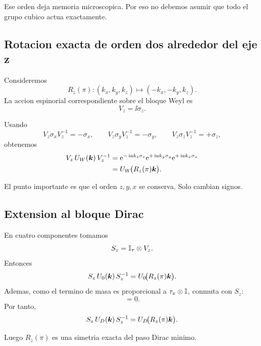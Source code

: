 Ese orden deja memoria microscopica. Por eso no debemos asumir que todo el grupo cubico actua exactamente.

\subsection{Rotacion exacta de orden dos alrededor del eje z}
Consideremos
\begin{equation}
R_z(\pi):(k_x,k_y,k_z)\mapsto(-k_x,-k_y,k_z).
\end{equation}
La accion espinorial correspondiente sobre el bloque Weyl es
\begin{equation}
V_z=\ii\sigma_z.
\end{equation}

Usando
\begin{equation}
V_z\sigma_xV_z^{-1}=-\sigma_x,
\qquad
V_z\sigma_yV_z^{-1}=-\sigma_y,
\qquad
V_z\sigma_zV_z^{-1}=+\sigma_z,
\label{c25:eq:Vzaction}
\end{equation}
obtenemos
\begin{align}
V_z\,U_W(\bm{k})\,V_z^{-1}
&=
\mathrm{e}^{-\,\mathrm{i} a k_z \sigma_z}
\mathrm{e}^{+\,\mathrm{i} a k_y \sigma_y}
\mathrm{e}^{+\,\mathrm{i} a k_x \sigma_x}\notag\\
&=
U_W\!\bigl(R_z(\pi)\bm{k}\bigr).
\label{c25:eq:C2zW}
\end{align}

El punto importante es que el orden \(z,y,x\) se conserva. Solo cambian signos.

\subsection{Extension al bloque Dirac}
En cuatro componentes tomamos
\begin{equation}
S_z=\mathbb{I}_{\tau}\otimes V_z.
\end{equation}
Entonces
\begin{equation}
S_z\,U_0(\bm{k})\,S_z^{-1}=U_0\!\bigl(R_z(\pi)\bm{k}\bigr).
\end{equation}
Ademas, como el termino de masa es proporcional a \(\tau_x\otimes\mathbb{I}\), conmuta con \(S_z\):
\begin{equation}
[S_z,M]=0.
\end{equation}
Por tanto,
\begin{equation}
S_z\,U_D(\bm{k})\,S_z^{-1}=U_D\!\bigl(R_z(\pi)\bm{k}\bigr).
\label{c25:eq:C2zD}
\end{equation}

Luego \(R_z(\pi)\) es una simetria exacta del paso Dirac minimo.

